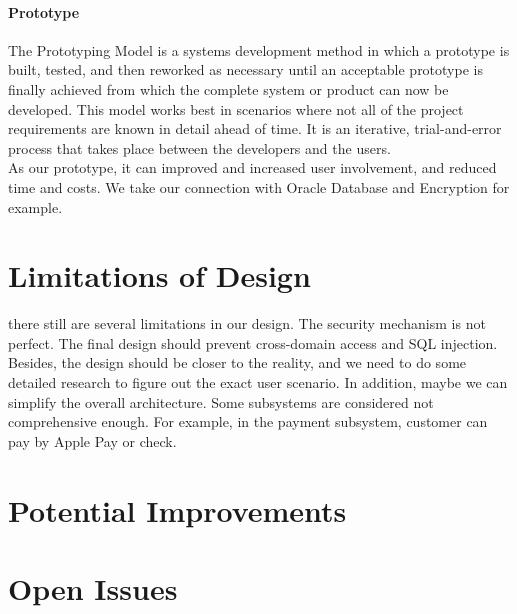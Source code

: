 \documentclass[12pt]{scrreprt}
\begin{document}
\subsubsection{Prototype}
The Prototyping Model is a systems development method in which a prototype is built, tested, and then reworked as necessary until an acceptable prototype is finally achieved from which the complete system or product can now be developed. This model works best in scenarios where not all of the project requirements are known in detail ahead of time. It is an iterative, trial-and-error process that takes place between the developers and the users.\\
As our prototype, it can improved and increased user involvement, and reduced time and costs. We take our connection with Oracle Database and Encryption for example.

\chapter{Limitations of Design}
there still are several limitations in our design. The security mechanism is not perfect. The final design should prevent cross-domain access and SQL injection. Besides, the design should be closer to the reality, and we need to do some detailed research to figure out the exact user scenario. In addition, maybe we can simplify the overall architecture. Some subsystems are considered not comprehensive enough. For example, in the payment subsystem, customer can pay by Apple Pay or check.

\chapter{Potential Improvements}


\chapter{Open Issues}
\end{document}
